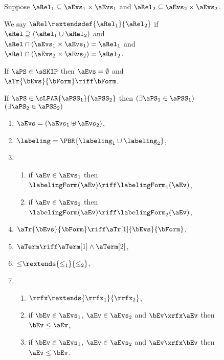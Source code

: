 \begin{figure}
  \raggedright
  \noindent
  Suppose $\aRel_1\subseteq\aEvs_1\times\aEvs_1$ and $\aRel_2\subseteq\aEvs_2\times\aEvs_2$.

  We say $\aRel \rextendsdef{\aRel_1}{\aRel_2}$ if
  $\aRel\supseteq (\aRel_1\cup \aRel_2)$ and
  $\aRel\cap(\aEvs_1\times \aEvs_1) = \aRel_1$ and
  $\aRel\cap(\aEvs_2\times \aEvs_2) = \aRel_2$.
  \medskip
  
  \noindent
  If $\aPS\in\sSKIP$ then $\aEvs = \emptyset$ and
  $\aTr{\bEvs}{\bForm} \riff \bForm$.
  \medskip

  \noindent
  If $\aPS \in \sLPAR{\aPSS_1}{\aPSS_2}$ then  
  $(\exists\aPS_1\in\aPSS_1)$ $(\exists\aPS_2\in\aPSS_2)$
  \begin{multicols}{2}
    \begin{enumerate}[topsep=0pt,label=(\textsc{p}\arabic*),ref=\textsc{p}\arabic*]
    \item \label{par-E}
      $\aEvs = (\aEvs_1\uplus\aEvs_2)$,
    \item \label{par-lambda}
      ${\labeling}=\PBR{{\labeling_1}\cup {\labeling_2}}$, 
    \item[] 
      \begin{enumerate}[leftmargin=0pt]
      \item \label{par-kappa1}
        if $\aEv\in\aEvs_1$ then $\labelingForm(\aEv) \riff \labelingForm_1(\aEv)$,
      \item \label{par-kappa2}
        if $\aEv\in\aEvs_2$ then $\labelingForm(\aEv) \riff \labelingForm_2(\aEv)$,
      \end{enumerate}
    \item \label{par-tau}
      $\aTr{\bEvs}{\bForm} \riff \aTr[1]{\bEvs}{\bForm}$,
    \item \label{par-term}
      $\aTerm \riff \aTerm[1]\land\aTerm[2]$,
    \item \label{par-le}
        ${\le}\rextends{\le_1}{\le_2}$,
    \item[] 
      \begin{enumerate}[leftmargin=0pt]
      \item
        \label{par-rf-extends}
        ${\rrfx}\rextends{\rrfx_1}{\rrfx_2}$,
      \item \label{par-rf-le1}
        if $\bEv\in\aEvs_1$, $\aEv\in\aEvs_2$ and $\bEv\xrfx\aEv$ then $\bEv\le\aEv$,
      \item \label{par-rf-le2}
        if $\bEv\in\aEvs_1$, $\aEv\in\aEvs_2$ and $\aEv\xrfx\bEv$ then $\aEv\le\bEv$.
      \end{enumerate}
    \end{enumerate}
  \end{multicols}
  \medskip


\end{figure}
